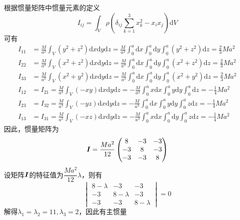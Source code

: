 \begin{solution}
根据惯量矩阵中惯量元素的定义
\begin{equation*}
	I_{ij} = \int_V \rho \left(\delta_{ij} \sum_{k=1}^3 x_k^2 - x_ix_j\right) \mathrm{d} V
\end{equation*}
可有
\begin{align*}
	I_{11} & = \frac{M}{a^3} \int_V (y^2+z^2) \mathrm{d}x\mathrm{d}y\mathrm{d}z = \frac{M}{a^3} \int_0^a \mathrm{d} x \int_0^a \mathrm{d} y \int_0^a (y^2+z^2) \mathrm{d} z = \frac23 Ma^2 \\
	I_{22} & = \frac{M}{a^3} \int_V (x^2+z^2) \mathrm{d}x\mathrm{d}y\mathrm{d}z = \frac{M}{a^3} \int_0^a \mathrm{d} x \int_0^a \mathrm{d} y \int_0^a (x^2+z^2) \mathrm{d} z = \frac23 Ma^2 \\
	I_{33} & = \frac{M}{a^3} \int_V (x^2+y^2) \mathrm{d}x\mathrm{d}y\mathrm{d}z = \frac{M}{a^3} \int_0^a \mathrm{d} x \int_0^a \mathrm{d} y \int_0^a (x^2+y^2) \mathrm{d} z = \frac23 Ma^2 \\
	I_{12} & = I_{21} = \frac{M}{a^3} \int_V (-xy) \mathrm{d}x\mathrm{d}y\mathrm{d}z = -\frac{M}{a^3} \int_0^a x \mathrm{d} x \int_0^a y \mathrm{d} y \int_0^a \mathrm{d} z = -\frac14 Ma^2 \\
	I_{23} & = I_{32} = \frac{M}{a^3} \int_V (-yz) \mathrm{d}x\mathrm{d}y\mathrm{d}z = -\frac{M}{a^3} \int_0^a \mathrm{d} x \int_0^a y \mathrm{d} y \int_0^a z \mathrm{d} z = -\frac14 Ma^2 \\
	I_{13} & = I_{31} = \frac{M}{a^3} \int_V (-xz) \mathrm{d}x\mathrm{d}y\mathrm{d}z = -\frac{M}{a^3} \int_0^a x \mathrm{d} x \int_0^a \mathrm{d} y \int_0^a z \mathrm{d} z = -\frac14 Ma^2
\end{align*}
因此，惯量矩阵为
\begin{equation*}
	\boldsymbol{I} = \frac{Ma^2}{12} \begin{pmatrix} 8 & -3 & -3 \\ -3 & 8 & -3 \\ -3 & -3 & 8 \end{pmatrix}
\end{equation*}
设矩阵$\boldsymbol{I}$的特征值为$\dfrac{Ma^2}{12} \lambda$，则有
\begin{equation*}
	\begin{vmatrix} 8-\lambda & -3 & -3 \\ -3 & 8-\lambda & -3 \\ -3 & -3 & 8-\lambda \end{vmatrix} = 0
\end{equation*}
解得$\lambda_1=\lambda_2=11,\lambda_3=2$，因此有主惯量

\end{solution}
